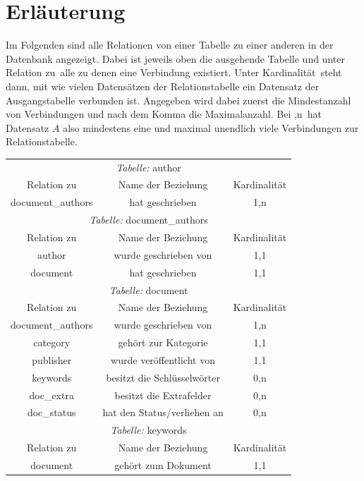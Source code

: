 \section{Erläuterung}
Im Folgenden sind alle Relationen von einer Tabelle zu einer anderen 
in der Datenbank angezeigt. Dabei ist jeweils oben die ausgehende Tabelle und 
unter \glqq Relation zu\grqq\ alle zu denen eine Verbindung existiert. Unter 
\glqq Kardinalität\grqq\ steht dann, mit wie vielen Datensätzen der 
Relationstabelle ein Datensatz der Ausgangstabelle verbunden ist. Angegeben wird 
dabei zuerst die Mindestanzahl von Verbindungen und nach dem Komma die 
Maximalanzahl. Bei ,n\grqq\ hat Datensatz $A$ also mindestens eine und 
maximal unendlich viele Verbindungen zur Relationstabelle.

\begin{longtable}{@{}ccc@{}}
  \toprule
  \multicolumn{3}{c}{\emph{Tabelle:} author} \\
  Relation zu & Name der Beziehung & Kardinalität \\
  \cmidrule(lr){1-1}\cmidrule(lr){2-2}\cmidrule(lr){3-3}
  document\_authors & hat geschrieben & 1,n \\
  
  \toprule
  \multicolumn{3}{c}{\emph{Tabelle:} document\_authors} \\
  Relation zu & Name der Beziehung & Kardinalität \\
  \cmidrule(lr){1-1}\cmidrule(lr){2-2}\cmidrule(lr){3-3}
  author & wurde geschrieben von & 1,1 \\
  document & hat geschrieben & 1,1\\

  \toprule
  \multicolumn{3}{c}{\emph{Tabelle:} document} \\
  Relation zu & Name der Beziehung & Kardinalität \\
  \cmidrule(lr){1-1}\cmidrule(lr){2-2}\cmidrule(lr){3-3}
  document\_authors & wurde geschrieben von & 1,n\\
  category & gehört zur Kategorie & 1,1\\
  publisher & wurde veröffentlicht von & 1,1\\
  keywords & besitzt die Schlüsselwörter & 0,n\\  
  doc\_extra & besitzt die Extrafelder & 0,n\\
  doc\_status & hat den Status/verliehen an & 0,n\\

  \toprule
  \multicolumn{3}{c}{\emph{Tabelle:} keywords} \\
  Relation zu & Name der Beziehung & Kardinalität \\
  \cmidrule(lr){1-1}\cmidrule(lr){2-2}\cmidrule(lr){3-3}
  document & gehört zum Dokument & 1,1 \\


\end{longtable}

